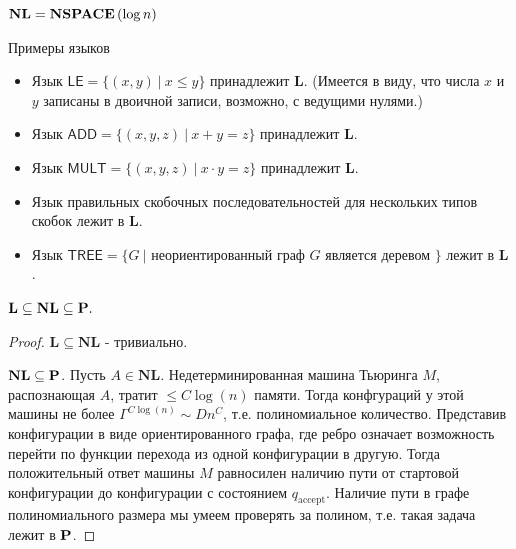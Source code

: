 \begin{definition}
$\mathbf{NL}=\textbf{NSPACE}\left({\log n}\right)$
\end{definition}

\begin{example}
    Примеры языков
    \begin{itemize}
        \item Язык $\mathsf{LE} = \{(x, y) \ | \ x \leq y\}$ принадлежит $\mathbf{L}$. (Имеется в виду, что числа $x$ и $y$ записаны в двоичной записи, возможно, с ведущими нулями.)

        \item Язык $\mathsf{ADD} = \{(x, y, z) \ | \ x + y = z \}$ принадлежит $\mathbf{L}$.

        \item Язык $\mathsf{MULT} = \{(x, y, z) \ | \ x \cdot y = z \}$ принадлежит $\mathbf{L}$.

        \item Язык правильных скобочных последовательностей для нескольких типов скобок лежит в $\mathbf{L}$.

        \item Язык $\mathsf{TREE} = \{ G \ |$ неориентированный граф $G$ является деревом $\}$ лежит в $\mathbf{L}$.
    \end{itemize}
\end{example}

\begin{note}
$\mathbf{L} \subseteq \mathbf{NL} \subseteq \textbf{P}.$ 

\end{note}


\begin{proof}
$\mathbf{L} \subseteq \mathbf{NL}$ - тривиально.

$\mathbf{NL} \subseteq \textbf{P}$.
  Пусть $A \in \mathbf{NL}$. Недетерминированная машина Тьюринга $M$, распознающая $A$, тратит $\leq C\log(n)$ памяти. Тогда конфгураций у этой машины не более $\Gamma^{C\log(n)} \sim Dn^C$, т.е. полиномиальное количество. Представив конфигурации в виде  ориентированного графа, где ребро означает возможность перейти по функции перехода из одной конфигурации в другую. Тогда положительный ответ машины $M$ равносилен наличию пути от стартовой конфигурации до конфигурации с состоянием $q_{\text{accept}}$. Наличие пути в графе полиномиального размера мы умеем проверять за полином, т.е. такая задача лежит в $\textbf{P}$.  
\end{proof}

